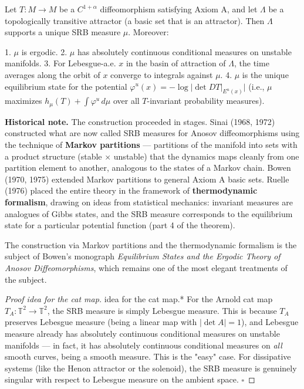 \begin{theorem}\label{thm:12.9}
Let $T: M \to M$ be a $C^{1+\alpha}$ diffeomorphism satisfying Axiom A, and let $\Lambda$ be a topologically transitive attractor (a basic set that is an attractor). Then $\Lambda$ supports a unique SRB measure $\mu$. Moreover:

1. $\mu$ is ergodic.
2. $\mu$ has absolutely continuous conditional measures on unstable manifolds.
3. For Lebesgue-a.e. $x$ in the basin of attraction of $\Lambda$, the time averages along the orbit of $x$ converge to integrals against $\mu$.
4. $\mu$ is the unique equilibrium state for the potential $\varphi^u(x) = -\log |\det DT|_{E^u(x)}|$ (i.e., $\mu$ maximizes $h_\mu(T) + \int \varphi^u \, d\mu$ over all $T$-invariant probability measures).

\textbf{Historical note.} The construction proceeded in stages. Sinai (1968, 1972) constructed what are now called SRB measures for Anosov diffeomorphisms using the technique of \textbf{Markov partitions} --- partitions of the manifold into sets with a product structure (stable $\times$ unstable) that the dynamics maps cleanly from one partition element to another, analogous to the states of a Markov chain. Bowen (1970, 1975) extended Markov partitions to general Axiom A basic sets. Ruelle (1976) placed the entire theory in the framework of \textbf{thermodynamic formalism}, drawing on ideas from statistical mechanics: invariant measures are analogues of Gibbs states, and the SRB measure corresponds to the equilibrium state for a particular potential function (part 4 of the theorem).

The construction via Markov partitions and the thermodynamic formalism is the subject of Bowen's monograph \textit{Equilibrium States and the Ergodic Theory of Anosov Diffeomorphisms}, which remains one of the most elegant treatments of the subject.
\end{theorem}


\begin{proof}[Proof idea for the cat map]
idea for the cat map.* For the Arnold cat map $T_A: \mathbb{T}^2 \to \mathbb{T}^2$, the SRB measure is simply Lebesgue measure. This is because $T_A$ preserves Lebesgue measure (being a linear map with $|\det A| = 1$), and Lebesgue measure already has absolutely continuous conditional measures on unstable manifolds --- in fact, it has absolutely continuous conditional measures on \textit{all} smooth curves, being a smooth measure. This is the "easy" case. For dissipative systems (like the Henon attractor or the solenoid), the SRB measure is genuinely singular with respect to Lebesgue measure on the ambient space. $\square$


\end{proof}

